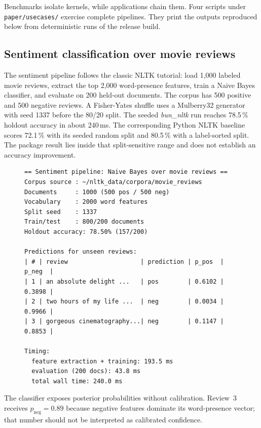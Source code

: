 \documentclass[pdflatex,sn-mathphys-num]{sn-jnl}
\theoremstyle{thmstyleone}
\begin{document}
Benchmarks isolate kernels, while applications chain them. Four scripts under \texttt{paper/usecases/} exercise complete pipelines. They print the outputs reproduced below from deterministic runs of the release build.

\subsection{Sentiment classification over movie reviews}\label{sec:uc-sentiment}

The sentiment pipeline follows the classic NLTK tutorial: load 1{,}000 labeled movie reviews, extract the top 2{,}000 word-presence features, train a Naive Bayes classifier, and evaluate on 200 held-out documents. The corpus has 500 positive and 500 negative reviews. A Fisher-Yates shuffle uses a Mulberry32 generator with seed 1337 before the 80/20 split. The seeded \emph{bun\_nltk} run reaches 78.5\,\% holdout accuracy in about 240\,ms. The corresponding Python NLTK baseline scores 72.1\,\% with its seeded random split and 80.5\,\% with a label-sorted split. The package result lies inside that split-sensitive range and does not establish an accuracy improvement.

\begin{figure}[H]
\begin{lstlisting}[basicstyle=\ttfamily\scriptsize,caption={Captured output of \texttt{paper/usecases/sentiment\_pipeline.ts} (abridged).},label={lst:sentiment}]
== Sentiment pipeline: Naive Bayes over movie reviews ==
Corpus source : ~/nltk_data/corpora/movie_reviews
Documents     : 1000 (500 pos / 500 neg)
Vocabulary    : 2000 word features
Split seed    : 1337
Train/test    : 800/200 documents
Holdout accuracy: 78.50% (157/200)

Predictions for unseen reviews:
| # | review                    | prediction | p_pos  | p_neg  |
| 1 | an absolute delight ...   | pos        | 0.6102 | 0.3898 |
| 2 | two hours of my life ...  | neg        | 0.0034 | 0.9966 |
| 3 | gorgeous cinematography...| neg        | 0.1147 | 0.8853 |

Timing:
  feature extraction + training: 193.5 ms
  evaluation (200 docs): 43.8 ms
  total wall time: 240.0 ms
\end{lstlisting}
\end{figure}

The classifier exposes posterior probabilities without calibration. Review~3 receives $p_{\text{neg}}=0.89$ because negative features dominate its word-presence vector; that number should not be interpreted as calibrated confidence.
\end{document}
